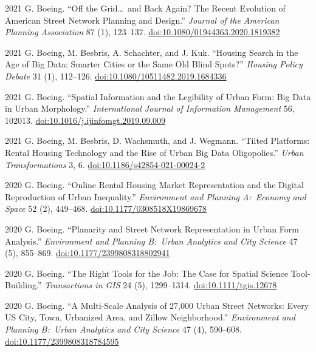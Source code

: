 \documentclass[11pt,letterpaper]{report}
\begin{document}
\begin{tablist}
        \item[2021] \tab{}G. Boeing. \enquote{Off the Grid\ldots\ and Back Again? The Recent Evolution of American Street Network Planning and Design.} \textit{Journal of the American Planning Association} 87 (1), 123--137. \href{https://doi.org/10.1080/01944363.2020.1819382}{doi:10.1080/01944363.2020.1819382}

        \item[2021] \tab{}G. Boeing, M. Besbris, A. Schachter, and J. Kuk. \enquote{Housing Search in the Age of Big Data: Smarter Cities or the Same Old Blind Spots?} \textit{Housing Policy Debate} 31 (1), 112--126. \href{https://doi.org/10.1080/10511482.2019.1684336}{doi:10.1080/10511482.2019.1684336}

        \item[2021] \tab{}G. Boeing. \enquote{Spatial Information and the Legibility of Urban Form: Big Data in Urban Morphology.} \textit{International Journal of Information Management} 56, 102013. \href{https://doi.org/10.1016/j.ijinfomgt.2019.09.009}{doi:10.1016/j.ijinfomgt.2019.09.009}

        \item[2021] \tab{}G. Boeing, M. Besbris, D. Wachsmuth, and J. Wegmann. \enquote{Tilted Platforms: Rental Housing Technology and the Rise of Urban Big Data Oligopolies.} \textit{Urban Transformations} 3, 6. \href{https://doi.org/10.1186/s42854-021-00024-2}{doi:10.1186/s42854-021-00024-2}

        \item[2020] \tab{}G. Boeing. \enquote{Online Rental Housing Market Representation and the Digital Reproduction of Urban Inequality.} \textit{Environment and Planning A:\ Economy and Space} 52 (2), 449--468. \href{https://doi.org/10.1177/0308518X19869678}{doi:10.1177/0308518X19869678}

        \item[2020] \tab{}G. Boeing. \enquote{Planarity and Street Network Representation in Urban Form Analysis.} \textit{Environment and Planning B:\ Urban Analytics and City Science} 47 (5), 855--869. \href{https://doi.org/10.1177/2399808318802941}{doi:10.1177/2399808318802941}

        \item[2020] \tab{}G. Boeing. \enquote{The Right Tools for the Job: The Case for Spatial Science Tool-Building.} \textit{Transactions in GIS} 24 (5), 1299--1314. \href{https://doi.org/10.1111/tgis.12678}{doi:10.1111/tgis.12678}

        \item[2020] \tab{}G. Boeing. \enquote{A Multi-Scale Analysis of 27,000 Urban Street Networks: Every US City, Town, Urbanized Area, and Zillow Neighborhood.} \textit{Environment and Planning B:\ Urban Analytics and City Science} 47 (4), 590--608. \href{https://doi.org/10.1177/2399808318784595}{doi:10.1177/2399808318784595}


\end{tablist}
\end{document}
